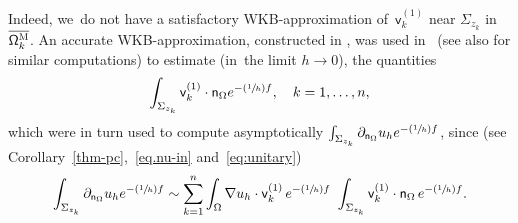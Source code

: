 \documentclass[JEP,XML,SOM,Unicode,NoEqCountersInSection,NoFloatCountersInSection,published]{cedram}
\newcommand{\Psfrac}[2]{(\sfrac{#1}{#2})}
\theoremstyle{plain}
\theoremstyle{definition}
\begin{document}
Indeed, we~do not
have a
satisfactory
WKB-approximation of~$ \mathsf v_k^{(1)} $ near
$\Sigma_{z_k}$ in $\overline{\mathsf \Omega_k^{\textsc{M}}}$.
An accurate WKB-approximation, constructed in \cite{helffer-nier-06}, was used in~\cite{DLLN} (see also
\cite{DLLN-saddle1}
for similar computations) to estimate
(in~the limit $h \to 0$), the quantities
\begin{equation}\label{eq.int-bordvk}
\int_{\Sigma_{z_k}} \mathsf v_k^{(1)} \cdot \mathsf n_{\Omega} e^{-\Psfrac 1hf}, \quad k=1,\ldots,n,
\end{equation}
which were in turn used to compute asymptotically $\int_{\Sigma_{z_k}}\partial_{\mathsf n_\Omega}u_h e^{-\Psfrac 1hf}$, since (see Corollary~\ref{thm-pc},~\eqref{eq.nu-in} and~\eqref{eq:unitary})
\[
\int_{\Sigma_{z_k}}\partial_{\mathsf n_\Omega}u_h e^{-\Psfrac 1hf}\sim
\sum_{k=1}^n \int_\Omega \nabla u_h\cdot \mathsf v_k^{(1)} \,
e^{-\Psfrac 1hf}\ \int_{\Sigma_{z_k}} \mathsf v_k^{(1)} \cdot \mathsf
n_{\Omega} \, e^{-\Psfrac 1hf}.
\]
\end{document}
